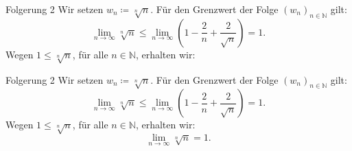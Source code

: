 \documentclass[10pt]{beamer}
\def\bN{\mathbb{N}}
\begin{document}
\begin{frame}{Folgerung 2}
    Wir setzen \( w_{n} \coloneq \sqrt[n]{n} \). Für den Grenzwert der Folge \( \left( w_{n} \right)_{n \in \bN} \) gilt:
    \[
        \lim_{n \to \infty} \sqrt[n]{n} 
        \leq \lim_{n \to \infty} \left( 1 - \frac{2}{n} + \frac{2}{\sqrt{n}} \right)
        = 1.
    \]
    Wegen \( 1 \leq \sqrt[n]{n} \), für alle \( n \in \bN \), erhalten wir:
\end{frame}



\begin{frame}{Folgerung 2}
    Wir setzen \( w_{n} \coloneq \sqrt[n]{n} \). Für den Grenzwert der Folge \( \left( w_{n} \right)_{n \in \bN} \) gilt:
    \[
        \lim_{n \to \infty} \sqrt[n]{n} 
        \leq \lim_{n \to \infty} \left( 1 - \frac{2}{n} + \frac{2}{\sqrt{n}} \right)
        = 1.
    \]
    Wegen \( 1 \leq \sqrt[n]{n} \), für alle \( n \in \bN \), erhalten wir:
    \[
        \lim_{n \to \infty} \sqrt[n]{n}
        = 1.
    \]
\end{frame}
\end{document}
